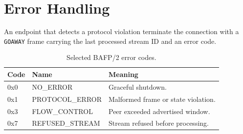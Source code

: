 \section{Error Handling}
An endpoint that detects a protocol violation  terminate the connection with a
\texttt{GOAWAY} frame carrying the last processed stream ID and an error code.

\begin{table}[ht]\centering
\begin{tabularx}{\linewidth}{@{}l l X@{}}
\toprule
\textbf{Code} & \textbf{Name} & \textbf{Meaning}\\
\midrule
0x0 & NO\_ERROR        & Graceful shutdown.\\
0x1 & PROTOCOL\_ERROR  & Malformed frame or state violation.\\
0x3 & FLOW\_CONTROL    & Peer exceeded advertised window.\\
0x7 & REFUSED\_STREAM  & Stream refused before processing.\\
\bottomrule
\end{tabularx}
\caption{Selected BAFP/2 error codes.}
\end{table}
